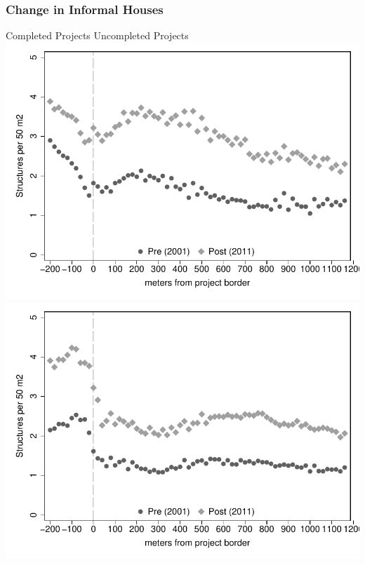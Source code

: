 \documentclass[aspectratio=149]{beamer}
\begin{document}
\begin{frame}
\frametitle{Change in Informal Houses}
\hspace{10mm} Completed Projects \hspace{30mm} Uncompleted Projects
\hspace*{-10mm}
\includegraphics[scale=.48]{bblu_inf_c.pdf}
\includegraphics[scale=.48]{bblu_inf_p.pdf}
\end{frame}
\end{document}
